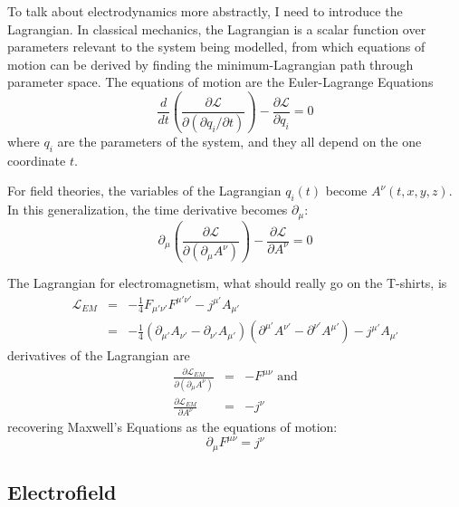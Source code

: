 \documentclass[12pt]{article}
\begin{document}
To talk about electrodynamics more abstractly, I need to introduce the
Lagrangian.  In classical mechanics, the Lagrangian is a scalar
function over parameters relevant to the system being modelled, from
which equations of motion can be derived by finding the
minimum-Lagrangian path through parameter space.  The equations of
motion are the Euler-Lagrange Equations
\begin{equation}
  \frac{d}{dt}\left(\frac{\partial \mathcal{L}}{\partial (\partial q_i/\partial t)}
  \right) - \frac{\partial \mathcal{L}}{\partial q_i} = 0
\end{equation}
where $q_i$ are the parameters of the system, and they all depend on
the one coordinate $t$.

For field theories, the variables of the Lagrangian $q_i(t)$ become
$A^\nu(t,x,y,z)$.  In this generalization, the time derivative becomes
$\partial_\mu$:
\begin{equation}
  \partial_\mu \left(\frac{\partial \mathcal{L}}{\partial (\partial_\mu A^\nu)}
  \right) - \frac{\partial \mathcal{L}}{\partial A^\nu} = 0
\end{equation}

The Lagrangian for electromagnetism, what should really go on the
T-shirts, is
\begin{eqnarray}
  \mathcal{L}_{EM} &=& -\frac{1}{4} F_{\mu'\nu'} F^{\mu'\nu'} - j^{\mu'} A_{\mu'} \\
  &=& -\frac{1}{4} (\partial_{\mu'}A_{\nu'} - \partial_{\nu'}A_{\mu'})(\partial^{\mu'}A^{\nu'} - \partial^{\nu'}A^{\mu'}) - j^{\mu'} A_{\mu'}
\end{eqnarray}
 derivatives of the Lagrangian are
\begin{eqnarray}
  \frac{\partial \mathcal{L}_{EM}}{\partial (\partial_\mu A^\nu)} &=& -F^{\mu\nu} \mbox{ and} \\
  \frac{\partial \mathcal{L}_{EM}}{\partial A^\nu} &=& -j^\nu
\end{eqnarray}
recovering Maxwell's Equations as the equations of motion:
\begin{equation}
  \partial_\mu F^{\mu\nu} = j^\nu
\end{equation}

\subsection{Electrofield}
\end{document}
